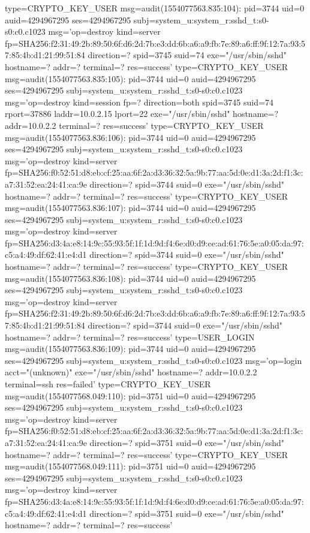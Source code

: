 \documentclass[]{report}
\newenvironment{Shaded}{}{}
\newcommand{\NormalTok}[1]{#1}
\begin{document}
\begin{Shaded}
\begin{Highlighting}[]
\NormalTok{type=CRYPTO_KEY_USER msg=audit(1554077563.835:104): pid=3744 uid=0 auid=4294967295 ses=4294967295 subj=system_u:system_r:sshd_t:s0-s0:c0.c1023 msg='op=destroy kind=server fp=SHA256:f2:31:49:2b:89:50:6f:d6:2d:7b:e3:dd:6b:a6:a9:fb:7e:89:a6:ff:9f:12:7a:93:57:85:4b:d1:21:99:51:84 direction=? spid=3745 suid=74  exe="/usr/sbin/sshd" hostname=? addr=? terminal=? res=success'}
\NormalTok{type=CRYPTO_KEY_USER msg=audit(1554077563.835:105): pid=3744 uid=0 auid=4294967295 ses=4294967295 subj=system_u:system_r:sshd_t:s0-s0:c0.c1023 msg='op=destroy kind=session fp=? direction=both spid=3745 suid=74 rport=37886 laddr=10.0.2.15 lport=22  exe="/usr/sbin/sshd" hostname=? addr=10.0.2.2 terminal=? res=success'}
\NormalTok{type=CRYPTO_KEY_USER msg=audit(1554077563.836:106): pid=3744 uid=0 auid=4294967295 ses=4294967295 subj=system_u:system_r:sshd_t:s0-s0:c0.c1023 msg='op=destroy kind=server fp=SHA256:f0:52:51:d8:eb:cf:25:aa:6f:2a:d3:36:32:5a:9b:77:aa:5d:0e:d1:3a:2d:f1:3c:a7:31:52:ea:24:41:ca:9e direction=? spid=3744 suid=0  exe="/usr/sbin/sshd" hostname=? addr=? terminal=? res=success'}
\NormalTok{type=CRYPTO_KEY_USER msg=audit(1554077563.836:107): pid=3744 uid=0 auid=4294967295 ses=4294967295 subj=system_u:system_r:sshd_t:s0-s0:c0.c1023 msg='op=destroy kind=server fp=SHA256:d3:4a:e8:14:9c:55:93:5f:1f:1d:9d:f4:6e:d0:d9:ce:ad:61:76:5e:a0:05:da:97:c5:a4:49:df:62:41:e4:d1 direction=? spid=3744 suid=0  exe="/usr/sbin/sshd" hostname=? addr=? terminal=? res=success'}
\NormalTok{type=CRYPTO_KEY_USER msg=audit(1554077563.836:108): pid=3744 uid=0 auid=4294967295 ses=4294967295 subj=system_u:system_r:sshd_t:s0-s0:c0.c1023 msg='op=destroy kind=server fp=SHA256:f2:31:49:2b:89:50:6f:d6:2d:7b:e3:dd:6b:a6:a9:fb:7e:89:a6:ff:9f:12:7a:93:57:85:4b:d1:21:99:51:84 direction=? spid=3744 suid=0  exe="/usr/sbin/sshd" hostname=? addr=? terminal=? res=success'}
\NormalTok{type=USER_LOGIN msg=audit(1554077563.836:109): pid=3744 uid=0 auid=4294967295 ses=4294967295 subj=system_u:system_r:sshd_t:s0-s0:c0.c1023 msg='op=login acct="(unknown)" exe="/usr/sbin/sshd" hostname=? addr=10.0.2.2 terminal=ssh res=failed'}
\NormalTok{type=CRYPTO_KEY_USER msg=audit(1554077568.049:110): pid=3751 uid=0 auid=4294967295 ses=4294967295 subj=system_u:system_r:sshd_t:s0-s0:c0.c1023 msg='op=destroy kind=server fp=SHA256:f0:52:51:d8:eb:cf:25:aa:6f:2a:d3:36:32:5a:9b:77:aa:5d:0e:d1:3a:2d:f1:3c:a7:31:52:ea:24:41:ca:9e direction=? spid=3751 suid=0  exe="/usr/sbin/sshd" hostname=? addr=? terminal=? res=success'}
\NormalTok{type=CRYPTO_KEY_USER msg=audit(1554077568.049:111): pid=3751 uid=0 auid=4294967295 ses=4294967295 subj=system_u:system_r:sshd_t:s0-s0:c0.c1023 msg='op=destroy kind=server fp=SHA256:d3:4a:e8:14:9c:55:93:5f:1f:1d:9d:f4:6e:d0:d9:ce:ad:61:76:5e:a0:05:da:97:c5:a4:49:df:62:41:e4:d1 direction=? spid=3751 suid=0  exe="/usr/sbin/sshd" hostname=? addr=? terminal=? res=success'}

\end{Highlighting}
\end{Shaded}
\end{document}
